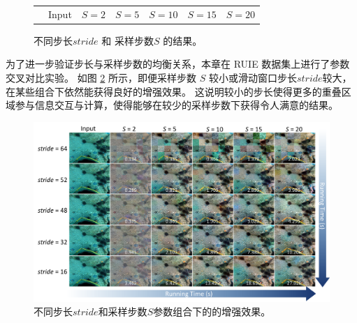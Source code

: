 \begin{figure}[ht]
\begin{center}
\begin{tabular}{ccccccc}
            \multicolumn{1}{c}{} & \small Input & \hspace{-0.36cm} \small $S=2$ & \hspace{-0.36cm} \small $S=5$ & \hspace{-0.36cm} \small $S=10$ & \hspace{-0.36cm} \small $S=15$ & \hspace{-0.36cm} \small $S=20$ \\
        \end{tabular}
    \end{center}
    \vspace{-6mm}
    \caption{\label{img:stride-S} 不同步长$stride$ 和 采样步数$S$ 的结果。}
    \vspace{-4mm}
\end{figure}

为了进一步验证步长与采样步数的均衡关系，本章在 RUIE \cite{RUIE} 数据集上进行了参数交叉对比实验。
如图 \ref{img:param} 所示，即便采样步数 $S$ 较小或滑动窗口步长$stride$较大，在某些组合下依然能获得良好的增强效果。
这说明较小的步长使得更多的重叠区域参与信息交互与计算，使得能够在较少的采样步数下获得令人满意的结果。
\begin{figure}[t]
    \centering
    \includegraphics[width=0.98\linewidth]{figures/ch3/compare/discussion/param.pdf}
    \caption{\label{img:param}不同步长$stride$和采样步数$S$参数组合下的的增强效果。}
\end{figure}
